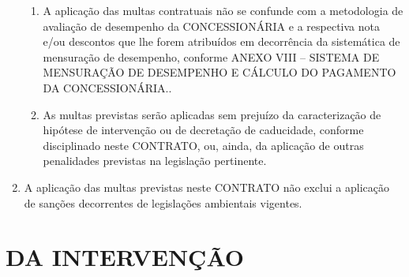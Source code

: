 \documentclass[a4paper,11pt]{report} %
\begin{document}
\begin{enumerate}
\begin{enumerate}[label*=\arabic*.]
\item \label{itm:BK2P} A aplicação das multas contratuais não se confunde com a metodologia de avaliação de desempenho da CONCESSIONÁRIA e a respectiva nota e/ou descontos que lhe forem atribuídos em decorrência da sistemática de mensuração de desempenho, conforme ANEXO VIII – SISTEMA DE MENSURAÇÃO DE DESEMPENHO E CÁLCULO DO PAGAMENTO DA CONCESSIONÁRIA..
\item \label{itm:T87R} As multas previstas serão aplicadas sem prejuízo da caracterização de hipótese de intervenção ou de decretação de caducidade, conforme disciplinado neste CONTRATO, ou, ainda, da aplicação de outras penalidades previstas na legislação pertinente.
\end{enumerate}

\item \label{itm:2Y2G} A aplicação das multas previstas neste CONTRATO não exclui a aplicação de sanções decorrentes de legislações ambientais vigentes.

\end{enumerate}

\section{DA INTERVENÇÃO}
\label{sec:JT5A}
\end{document}
